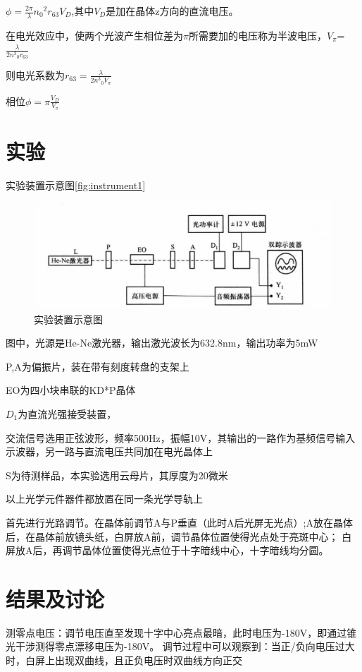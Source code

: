 \documentclass[font=default]{mpltx}
\begin{document}
$\phi = \frac{2\pi}{\lambda}{n_0}^{2}r_{63}V_D$,其中$V_D$是加在晶体z方向的直流电压。

在电光效应中，使两个光波产生相位差为$\pi$所需要加的电压称为半波电压，$V_\pi$=$\frac{\lambda}{2{n^3}_0r_{63}}$

则电光系数为$r_{63} = \frac{\lambda}{2{n^3}_0V_\pi}$

相位$\phi = \pi \frac{V_D}{V_\pi}$


\section{实验}
实验装置示意图\autoref{fig:instrument1}

\begin{figure}
  \centering
  \includegraphics[width=0.85\linewidth]{fig/instrument1.jpg}
  \caption{实验装置示意图}
  \label{sec:instrument1}
\end{figure}

图中，光源是He-Ne激光器，输出激光波长为632.8nm，输出功率为5mW

P,A为偏振片，装在带有刻度转盘的支架上

EO为四小块串联的KD*P晶体 

$D_1$为直流光强接受装置，

交流信号选用正弦波形，频率500Hz，振幅10V，其输出的一路作为基频信号输入示波器，另一路与直流电压共同加在电光晶体上

S为待测样品，本实验选用云母片，其厚度为20微米

以上光学元件器件都放置在同一条光学导轨上

首先进行光路调节。在晶体前调节A与P垂直（此时A后光屏无光点）;A放在晶体后，在晶体前放镜头纸，白屏放A前，调节晶体位置使得光点处于亮斑中心；
白屏放A后，再调节晶体位置使得光点位于十字暗线中心，十字暗线均分圆。

\section{结果及讨论}
测零点电压：调节电压直至发现十字中心亮点最暗，此时电压为-180V，即通过锥光干涉测得零点漂移电压为-180V。
调节过程中可以观察到：当正/负向电压过大时，白屏上出现双曲线，且正负电压时双曲线方向正交
\end{document}
